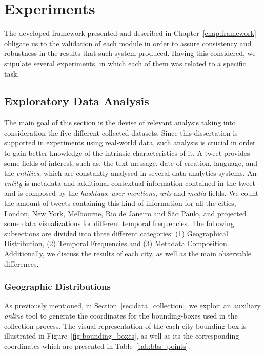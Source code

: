 \chapter{Experiments} \label{chap:experiments}

\minitoc \mtcskip \noindent

The developed framework presented and described in Chapter~\ref{chap:framework} obligate us to the validation of each module in order to assure consistency and robustness in the results that such system produced. Having this considered, we stipulate several experiments, in which each of them was related to a specific task. 

\section{Exploratory Data Analysis}\label{sec:exploratory_data_analysis}

The main goal of this section is the devise of relevant analysis taking into consideration the five different collected datasets. Since this dissertation is supported in experiments using real-world data, such analysis is crucial in order to gain better knowledge of the intrinsic characteristics of it. A tweet provides some fields of interest, such as, the text message, date of creation, language, and the \emph{entities}, which are constantly analysed in several data analytics systems. An \emph{entity} is metadata and additional contextual information contained in the tweet and is composed by the \emph{hashtags}, \emph{user mentions}, \emph{urls} and \emph{media} fields. We count the amount of tweets containing this kind of information for all the cities, London, New York, Melbourne, Rio de Janeiro and São Paulo, and projected some data visualizations for different temporal frequencies. The following subsections are divided into three different categories:  (1) Geographical Distribution, (2) Temporal Frequencies and (3) Metadata Composition. Additionally, we discuss the results of each city, as well as the main observable differences.

\subsection{Geographic Distributions}\label{subsec:geographical_distribution}

As previously mentioned, in Section~\ref{sec:data_collection}, we exploit an auxiliary \textit{online} tool to generate the coordinates for the bounding-boxes used in the collection process. The visual representation of the each city bounding-box is illustrated in Figure~\ref{fig:bounding_boxes}, as well as its the corresponding coordinates which are presented in Table~\ref{tab:bbs_points}.

